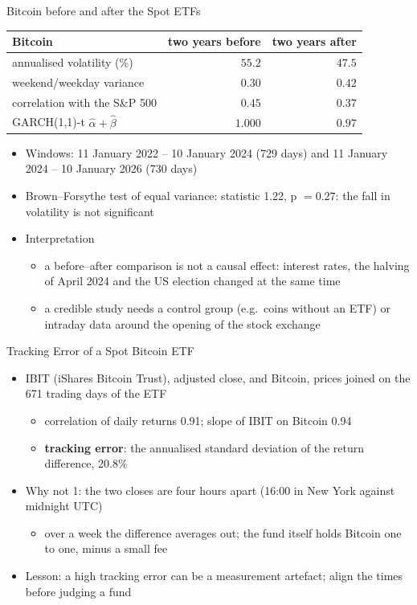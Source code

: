 \begin{frame}{Bitcoin before and after the Spot ETFs}
\itemsize{\footnotesize}
\begin{center}
\footnotesize
\begin{tabular}{lrr}
\toprule
Bitcoin & two years before & two years after \\
\midrule
annualised volatility (\%) & $55.2$ & $47.5$ \\
weekend/weekday variance & $0.30$ & $0.42$ \\
correlation with the S\&P 500 & $0.45$ & $0.37$ \\
GARCH(1,1)-t $\hat\alpha + \hat\beta$ & $1.000$ & $0.97$ \\
\bottomrule
\end{tabular}
\end{center}
\begin{itemize}
    \item Windows: 11 January 2022 -- 10 January 2024 (729 days) and 11 January 2024 -- 10 January 2026 (730 days)
    \item Brown--Forsythe test of equal variance: statistic 1.22, p $= 0.27$: the fall in volatility is not significant
    \item Interpretation
    \begin{itemize}
        \item a before--after comparison is not a causal effect: interest rates, the halving of April 2024 and the US election changed at the same time
        \item a credible study needs a control group (e.g.\ coins without an ETF) or intraday data around the opening of the stock exchange
    \end{itemize}
\end{itemize}
\end{frame}

\begin{frame}{Tracking Error of a Spot Bitcoin ETF}
\itemsize{\small}
\begin{itemize}
    \item IBIT (iShares Bitcoin Trust), adjusted close, and Bitcoin, prices joined on the 671 trading days of the ETF
    \begin{itemize}
        \item correlation of daily returns 0.91; slope of IBIT on Bitcoin 0.94
        \item \textbf{tracking error}: the annualised standard deviation of the return difference, 20.8\%
    \end{itemize}
    \item Why not 1: the two closes are four hours apart (16:00 in New York against midnight UTC)
    \begin{itemize}
        \item over a week the difference averages out; the fund itself holds Bitcoin one to one, minus a small fee
    \end{itemize}
    \item Lesson: a high tracking error can be a measurement artefact; align the times before judging a fund
\end{itemize}
\end{frame}



